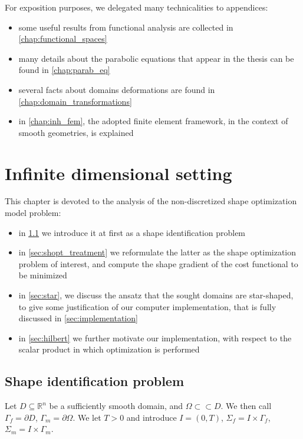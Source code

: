 \documentclass[english,a4paper,9pt,oneside]{scrbook}	%
\theoremstyle{break}
\theoremstyle{remark}
\newcommand{\mR}{\mathbb{R}}
\newcommand{\cc}{\subset\subset}
\begin{document}
For exposition purposes, we delegated many technicalities to appendices:

\begin{itemize}
	\item some useful results from functional analysis are collected in \cref{chap:functional_spaces}
	\item many details about the parabolic equations that appear in the thesis can be found in \cref{chap:parab_eq}
	\item several facts about domains deformations are found in \cref{chap:domain_transformations}
	\item in \cref{chap:inh_fem}, the adopted finite element framework, in the context of smooth geometries, is explained
\end{itemize}

\chapter{Infinite dimensional setting}
\label{chap:cts_shape_opt}

This chapter is devoted to the analysis of the non-discretized shape optimization model problem:

\begin{itemize}
	\item in \cref{sec:shid} we introduce it at first as a shape identification problem
	\item in \cref{sec:shopt_treatment} we reformulate the latter as the shape optimization problem of interest, and compute the shape gradient of the cost functional to be minimized
	\item in \cref{sec:star}, we discuss the ansatz that the sought domains are star-shaped, to give some justification of our computer implementation, that is fully discussed in \cref{sec:implementation}
	\item in \cref{sec:hilbert} we further motivate our implementation, with respect to the scalar product in which optimization is performed
\end{itemize}

\section{Shape identification problem}
\label{sec:shid}

Let $D\subseteq\mR^n$ be a sufficiently smooth domain, and $\Omega \cc D$. We then call $\Gamma_f=\partial D$, $\Gamma_m = \partial \Omega$. We let $T>0$ and introduce $I = (0,T)$, $\Sigma_f=I\times \Gamma_f$, $\Sigma_m=I\times \Gamma_m$.
\end{document}
